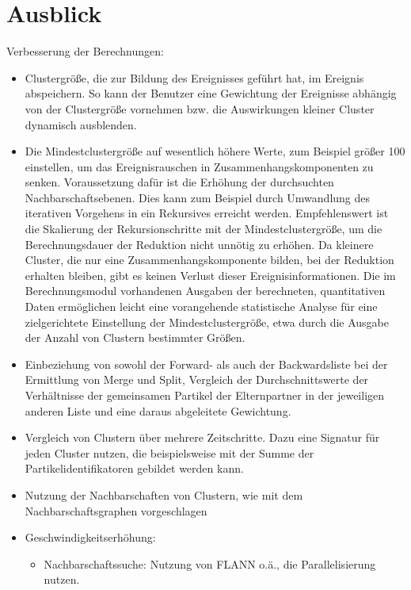 \chapter{Ausblick}
Verbesserung der Berechnungen:
\begin{itemize}
	\item Clustergröße, die zur Bildung des Ereignisses geführt hat, im Ereignis abspeichern. So kann der Benutzer eine Gewichtung der Ereignisse abhängig von der Clustergröße vornehmen bzw. die Auswirkungen kleiner Cluster dynamisch ausblenden.
	
	\item Die Mindestclustergröße auf wesentlich höhere Werte, zum Beispiel größer 100 einstellen, um das Ereignisrauschen in Zusammenhangskomponenten zu senken. Voraussetzung dafür ist die Erhöhung der durchsuchten Nachbarschaftsebenen. Dies kann zum Beispiel durch Umwandlung des iterativen Vorgehens in ein Rekursives erreicht werden. Empfehlenswert ist die Skalierung der Rekursionschritte mit der Mindestclustergröße, um die Berechnungsdauer der Reduktion nicht unnötig zu erhöhen. Da kleinere Cluster, die nur eine Zusammenhangskomponente bilden, bei der Reduktion erhalten bleiben, gibt es keinen Verlust dieser Ereignisinformationen.
	Die im Berechnungsmodul vorhandenen Ausgaben der berechneten, quantitativen Daten ermöglichen leicht eine vorangehende statistische Analyse für eine zielgerichtete Einstellung der Mindestclustergröße, etwa durch die Ausgabe der Anzahl von Clustern bestimmter Größen.
	
	\item Einbeziehung von sowohl der Forward- als auch der Backwardsliste bei der Ermittlung von Merge und Split, Vergleich der Durchschnittswerte der Verhältnisse der gemeinsamen Partikel der Elternpartner in der jeweiligen anderen Liste und eine daraus abgeleitete Gewichtung.
	
	\item Vergleich von Clustern über mehrere Zeitschritte. Dazu eine Signatur für jeden Cluster nutzen, die beispielsweise mit der Summe der Partikelidentifikatoren gebildet werden kann.
	
	\item Nutzung der Nachbarschaften von Clustern, wie mit dem Nachbarschaftsgraphen vorgeschlagen
	
	\item Geschwindigkeitserhöhung:
	\begin{itemize}
		\item Nachbarschaftssuche: Nutzung von FLANN o.ä., die Parallelisierung nutzen. \cite{ohara2013annAlgo}
		

\end{itemize}
\end{itemize}
